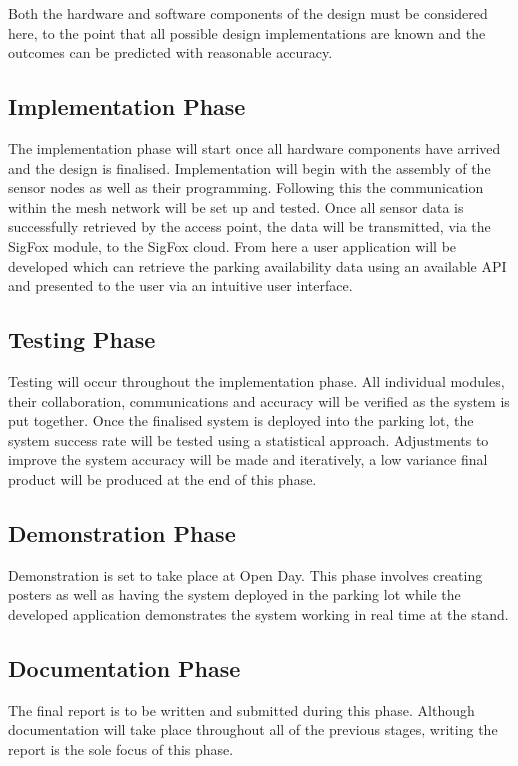 \documentclass[10pt,twocolumn]{witseiepaper}
\begin{document}
		Both the hardware and software components of the design must be considered here, to the point that all possible design implementations are known and the outcomes can be predicted with reasonable accuracy. 
	
	\subsection{Implementation Phase}
		The implementation phase will start once all hardware components have arrived and the design is finalised. Implementation will begin with the assembly of the sensor nodes as well as their programming. Following this the communication within the mesh network will be set up and tested. Once all sensor data is successfully retrieved by the access point, the data will be transmitted, via the SigFox module, to the SigFox cloud. From here a user application will be developed which can retrieve the parking availability data using an available API and presented to the user via an intuitive user interface.
	
	\subsection{Testing Phase}
		Testing will occur throughout the implementation phase. All individual modules, their collaboration, communications and accuracy will be verified as the system is put together. Once the finalised system is deployed into the parking lot, the system success rate will be tested using a statistical approach. Adjustments to improve the system accuracy will be made and iteratively, a low variance final product will be produced at the end of this phase.
		
	\subsection{Demonstration Phase}
		Demonstration is set to take place at Open Day. This phase involves creating posters as well as having the system deployed in the parking lot while the developed application demonstrates the system working in real time at the stand.
	
	\subsection{Documentation Phase}
		The final report is to be written and submitted during this phase. Although documentation will take place throughout all of the previous stages, writing the report is the sole focus of this phase.
	
\end{document}
